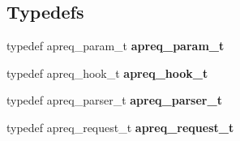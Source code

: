 \subsection*{Typedefs}
\begin{CompactItemize}
\item 
typedef apreq\_\-param\_\-t {\bf apreq\_\-param\_\-t}
\item 
{}
typedef apreq\_\-hook\_\-t {\bf apreq\_\-hook\_\-t}\label{group__params_a1}

\item 
{}
typedef apreq\_\-parser\_\-t {\bf apreq\_\-parser\_\-t}\label{group__params_a2}

\item 
typedef apreq\_\-request\_\-t {\bf apreq\_\-request\_\-t}
\end{CompactItemize}
